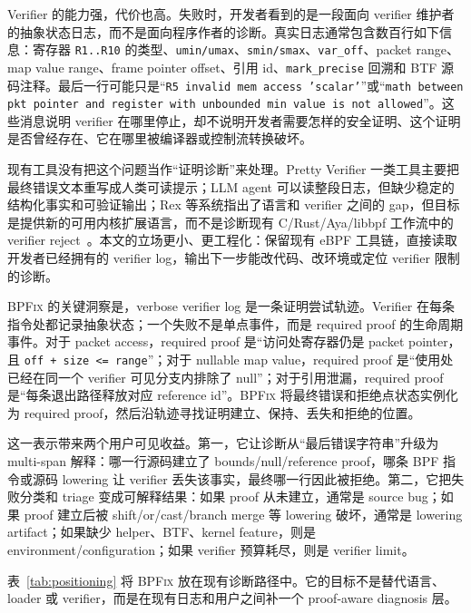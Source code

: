 \documentclass[letterpaper,twocolumn,10pt]{article}
\newcommand{\sys}{\textsc{BPFix}\xspace}
\newcommand{\code}[1]{\texttt{#1}}
\begin{document}
Verifier 的能力强，代价也高。失败时，开发者看到的是一段面向 verifier 维护者的抽象状态日志，而不是面向程序作者的诊断。真实日志通常包含数百行如下信息：寄存器 \code{R1..R10} 的类型、\code{umin/umax}、\code{smin/smax}、\code{var\_off}、packet range、map value range、frame pointer offset、引用 id、\code{mark\_precise} 回溯和 BTF 源码注释。最后一行可能只是“\code{R5 invalid mem access 'scalar'}”或“\code{math between pkt pointer and register with unbounded min value is not allowed}”。这些消息说明 verifier 在哪里停止，却不说明开发者需要怎样的安全证明、这个证明是否曾经存在、它在哪里被编译器或控制流转换破坏。

现有工具没有把这个问题当作“证明诊断”来处理。Pretty Verifier 一类工具主要把最终错误文本重写成人类可读提示；LLM agent 可以读整段日志，但缺少稳定的结构化事实和可验证输出；Rex 等系统指出了语言和 verifier 之间的 gap，但目标是提供新的可用内核扩展语言，而不是诊断现有 C/Rust/Aya/libbpf 工作流中的 verifier reject~\cite{rex2025,kgent2024,prettyverifier2025}。本文的立场更小、更工程化：保留现有 eBPF 工具链，直接读取开发者已经拥有的 verifier log，输出下一步能改代码、改环境或定位 verifier 限制的诊断。

\sys 的关键洞察是，verbose verifier log 是一条证明尝试轨迹。Verifier 在每条指令处都记录抽象状态；一个失败不是单点事件，而是 required proof 的生命周期事件。对于 packet access，required proof 是“访问处寄存器仍是 packet pointer，且 \code{off + size <= range}”；对于 nullable map value，required proof 是“使用处已经在同一个 verifier 可见分支内排除了 null”；对于引用泄漏，required proof 是“每条退出路径释放对应 reference id”。\sys 将最终错误和拒绝点状态实例化为 required proof，然后沿轨迹寻找证明建立、保持、丢失和拒绝的位置。

这一表示带来两个用户可见收益。第一，它让诊断从“最后错误字符串”升级为 multi-span 解释：哪一行源码建立了 bounds/null/reference proof，哪条 BPF 指令或源码 lowering 让 verifier 丢失该事实，最终哪一行因此被拒绝。第二，它把失败分类和 triage 变成可解释结果：如果 proof 从未建立，通常是 source bug；如果 proof 建立后被 shift/or/cast/branch merge 等 lowering 破坏，通常是 lowering artifact；如果缺少 helper、BTF、kernel feature，则是 environment/configuration；如果 verifier 预算耗尽，则是 verifier limit。

表~\ref{tab:positioning} 将 \sys 放在现有诊断路径中。它的目标不是替代语言、loader 或 verifier，而是在现有日志和用户之间补一个 proof-aware diagnosis 层。
\end{document}
